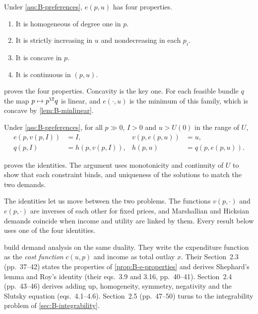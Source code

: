 \begin{proposition}\label{prop:B-e-properties}
Under \cref{ass:B-preferences}, $e(p, u)$ has four properties.
\begin{enumerate}[label=(\roman*)]
\item It is homogeneous of degree one in $p$.
\item It is strictly increasing in $u$ and nondecreasing in each $p_i$.
\item It is concave in $p$.
\item It is continuous in $(p, u)$.
\end{enumerate}
\end{proposition}

 proves the four properties. Concavity is the key one. For each feasible bundle
$q$ the map $p \mapsto p^\T q$ is linear, and $e(\cdot, u)$ is the minimum of this family, which is concave by
\cref{lem:B-minlinear}.

\begin{proposition}\label{prop:B-duality-identities}
Under \cref{ass:B-preferences}, for all $p \gg 0$, $I > 0$ and $u > U(0)$ in the range of $U$,
\begin{align}
e(p, v(p, I)) &= I, & v(p, e(p, u)) &= u, \label{eq:B-duality-1}\\
q(p, I) &= h(p, v(p, I)), & h(p, u) &= q(p, e(p, u)). \label{eq:B-duality-2}
\end{align}
\end{proposition}

 proves the identities. The argument uses monotonicity and continuity of $U$ to show that
each constraint binds, and uniqueness of the solutions to match the two demands.

The identities let us move between the two problems. The functions $v(p, \cdot)$ and $e(p, \cdot)$ are
inverses of each other for fixed prices, and Marshallian and Hicksian demands coincide when income and
utility are linked by them. Every result below uses one of the four identities.

\citet[ch.~2]{DeatonMuellbauer1980b} build demand analysis on the same duality. They write the expenditure
function as the \emph{cost function} $c(u, p)$ and income as total outlay $x$. Their Section~2.3
(pp.~37--42) states the properties of \cref{prop:B-e-properties} and derives Shephard's lemma and Roy's
identity (their eqs.~3.9 and 3.16, pp.~40--41). Section~2.4 (pp.~43--46) derives adding up, homogeneity,
symmetry, negativity and the Slutsky equation (eqs.~4.1--4.6). Section~2.5 (pp.~47--50) turns to the
integrability problem of \cref{sec:B-integrability}.

